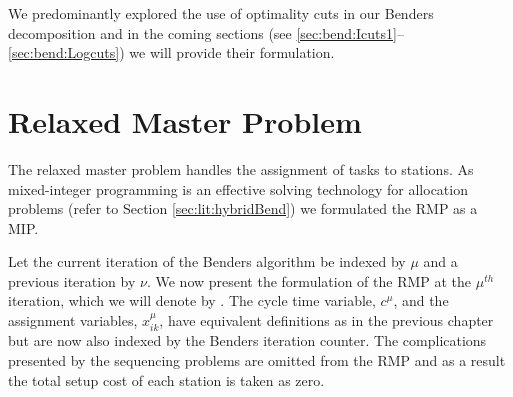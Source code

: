 
We predominantly explored the use of optimality cuts in our
Benders decomposition and in the coming sections 
(see \ref{sec:bend:Icuts1}--\ref{sec:bend:Logcuts}) we will
provide their formulation.

\section{Relaxed Master Problem}
\label{sec:bend:RMP}
The relaxed master problem handles the assignment
of tasks to stations.
As mixed-integer programming is an effective solving technology for
allocation problems (refer to Section \ref{sec:lit:hybridBend})
we formulated the RMP as a MIP.

Let the current iteration of the Benders
algorithm be indexed by $\mu$
and a previous iteration by $\nu$.
We now present the formulation of the RMP 
at the $\mu^{th}$ iteration, which we will denote
by \rmp{\mu}.
The cycle time variable, $c^\mu$, and the assignment
variables, $x_{ik}^\mu$, have equivalent definitions
as in the previous chapter but are now also indexed by the 
Benders iteration counter.
The complications presented by the sequencing problems
are omitted from the RMP and as a result the total setup
cost of each station is taken as zero.


